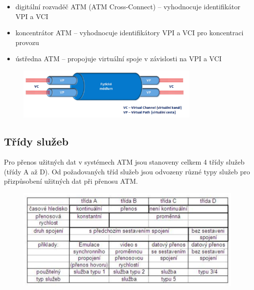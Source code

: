 \begin{itemize}
    \item digitální rozvaděč ATM (ATM Cross-Connect) -- vyhodnocuje identifikátor VPI a VCI
    \item koncentrátor ATM -- vyhodnocuje identifikátory VPI a VCI pro koncentraci provozu
    \item ústředna ATM -- propojuje virtuální spoje v závislosti na VPI a VCI
\end{itemize}

\begin{figure} [h]
    \centering
    \includegraphics[width=0.8\textwidth]{snimky/VC.png}
    \label{fig:virt-cesty-kanaly}
\end{figure}

\subsection{Třídy služeb}
Pro přenos užitných dat v systémech ATM jsou stanoveny celkem 4 třídy služeb (třídy A až D). Od požadovaných tříd služeb jsou odvozeny různé typy služeb pro přizpůsobení užitných dat při přenosu ATM.

\begin{figure}[h]
    \centering
    \includegraphics[scale=0.6]{snimky/sluzby.png}
\end{figure}
\newpage

